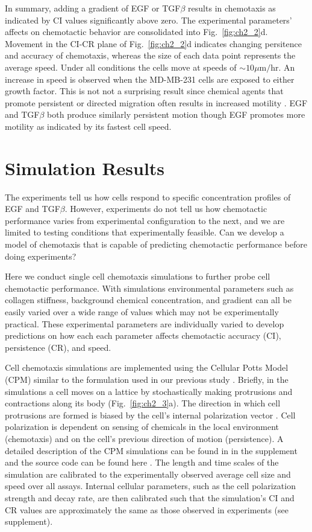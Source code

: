 In summary, adding a gradient of EGF or TGF$\beta$ results in chemotaxis as indicated by CI values significantly above zero. The experimental parameters' affects on chemotactic behavior are consolidated into Fig.\ \ref{fig:ch2_2}d. Movement in the CI-CR plane of Fig.\ \ref{fig:ch2_2}d indicates changing persitence and accuracy of chemotaxis, whereas the size of each data point represents the average speed. Under all conditions the cells move at speeds of $\sim 10 \mu\text{m}/\text{hr}$. An increase in speed is observed when the MD-MB-231 cells are exposed to either growth factor. This is not not a surprising result since chemical agents that promote persistent or directed migration often results in increased motility \cite{petrie2009random}. EGF and TGF$\beta$ both produce similarly persistent motion though EGF promotes more motility as indicated by its fastest cell speed.


\section{Simulation Results}

The experiments tell us how cells respond to specific concentration profiles of EGF and TGF$\beta$. However, experiments do not tell us how chemotactic performance varies from experimental configuration to the next, and we are limited to testing conditions that experimentally feasible. Can we develop a model of chemotaxis that is capable of predicting chemotactic performance before doing experiments?

Here we conduct single cell chemotaxis simulations to further probe cell chemotactic performance. With simulations environmental parameters such as collagen stiffness, background chemical concentration, and gradient can all be easily varied over a wide range of values which may not be experimentally practical. These experimental parameters are individually varied to develop predictions on how each each parameter affects chemotactic accuracy (CI), persistence (CR), and speed.

Cell chemotaxis simulations are implemented using the Cellular Potts Model (CPM) similar to the formulation used in our previous study \cite{varennes2016collective}. Briefly, in the simulations a cell moves on a lattice by stochastically making protrusions and contractions along its body (Fig.\ \ref{fig:ch2_3}a). The direction in which cell protrusions are formed is biased by the cell's internal polarization vector \red{[CITE]}. Cell polarization is dependent on sensing of chemicals in the local environment (chemotaxis) and on the cell's previous direction of motion (persistence). A detailed description of the CPM simulations can be found in in the supplement and the source code can be found here \red{[CITE]}.
The length and time scales of the simulation are calibrated to the experimentally observed average cell size and speed over all assays. Internal cellular parameters, such as the cell polarization strength and decay rate, are then calibrated such that the simulation's CI and CR values are approximately the same as those observed in experiments (see supplement).

